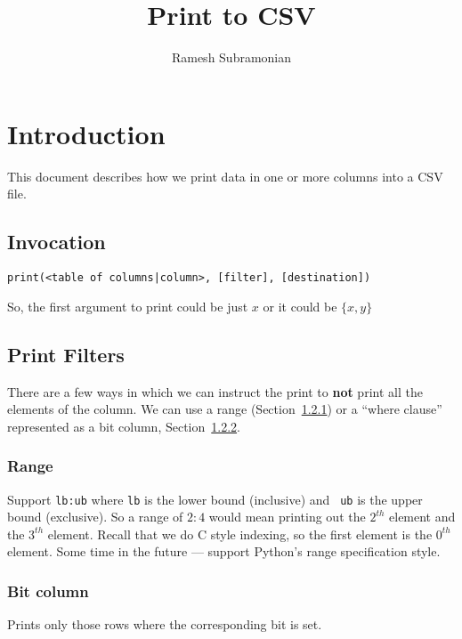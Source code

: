 \documentclass[letterpaper]{article}
\begin{document}
\title{Print to CSV}
\author{ Ramesh Subramonian }
\maketitle
\thispagestyle{fancy}
\cfoot{}
\rfoot{{\small \thepage}}

\section{Introduction}

This document describes how we print data in one or more columns into a CSV
file. 

\subsection{Invocation}

\begin{verbatim}
print(<table of columns|column>, [filter], [destination])
\end{verbatim}
So, the first argument to print could be just \(x\) or 
it could be \(\{x, y\}\)

\subsection{Print Filters}

There are a few ways in which we can instruct the print to {\bf not}
print all the elements of the column. We can use a range (Section~\ref{range})
or a ``where clause'' represented as a bit column, Section~\ref{bit_column}.

\subsubsection{Range}
\label{range}

Support
\verb+lb:ub+ where {\tt lb} is the lower bound (inclusive) and {\tt
ub} is the upper bound (exclusive). So a range of \(2:4\) would mean printing
out the \(2^{th}\) element and the \(3^{th}\) element. 
Recall that we do C style indexing, so the first element is the \(0^{th}\)
element. 
Some time in the future --- support Python's range specification style. 

\subsubsection{Bit column}
\label{bit_column}
Prints only those rows where the corresponding bit is set.
\end{document}
